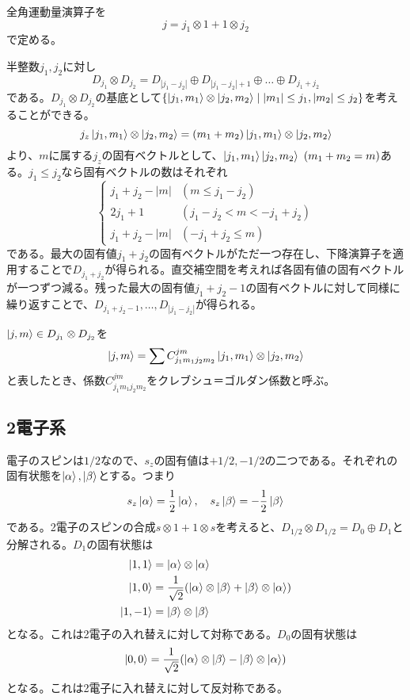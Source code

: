     全角運動量演算子を
        \[j = j_1 \otimes 1 + 1 \otimes j_2\]
    で定める。
    
    半整数$j_1, j_2$に対し
        \[D_{j_1} \otimes D_{j_2} = D_{|j_1-j_2|} \oplus D_{|j_1-j_2|+1} \oplus \dots \oplus D_{j_1+j_2}\]
    である。$D_{j_1} \otimes D_{j_2}$の基底として$\{\ket{j_1, m_1} \otimes \ket{j_2, m_2} \mid |m_1| \leq j_1, |m_2| \leq j_2\}$を考えることができる。
        \[j_z\ket{j_1, m_1} \otimes \ket{j_2, m_2} = (m_1 + m_2)\ket{j_1, m_1} \otimes \ket{j_2, m_2}\]
    より、$m$に属する$j_z$の固有ベクトルとして、$\ket{j_1, m_1}\ket{j_2, m_2}\ (m_1 + m_2 = m)$ある。$j_1 \leq j_2$なら固有ベクトルの数はそれぞれ
    \[
        \begin{cases}
            j_1 + j_2 - |m| & (m \leq j_1 - j_2)\\
            2j_1 + 1 & (j_1 - j_2 < m < -j_1 + j_2)\\
            j_1 + j_2 - |m| & (-j_1 + j_2 \leq m)
        \end{cases}
    \]
    である。最大の固有値$j_1 + j_2$の固有ベクトルがただ一つ存在し、下降演算子を適用することで$D_{j_1+j_2}$が得られる。直交補空間を考えれば各固有値の固有ベクトルが一つずつ減る。残った最大の固有値$j_1 + j_2 - 1$の固有ベクトルに対して同様に繰り返すことで、$D_{j_1+j_2-1}, \dots, D_{|j_1-j_2|}$が得られる。

    $\ket{j, m} \in D_{j_1} \otimes D_{j_2}$を
        \[\ket{j, m} = \sum C^{jm}_{j_1m_1j_2m_2} \ket{j_1, m_1} \otimes \ket{j_2, m_2}\]
    と表したとき、係数$C^{jm}_{j_1m_1j_2m_2}$をクレブシュ＝ゴルダン係数と呼ぶ。

\subsection{2電子系}
    電子のスピンは$1/2$なので、$s_z$の固有値は$+1/2, -1/2$の二つである。それぞれの固有状態を$\ket{\alpha}, \ket{\beta}$とする。つまり
        \[s_z\ket{\alpha} = \frac{1}{2}\ket{\alpha}, \quad s_z\ket{\beta} = -\frac{1}{2}\ket{\beta}\]
    である。2電子のスピンの合成$s \otimes 1 + 1 \otimes s$を考えると、$D_{1/2} \otimes D_{1/2} = D_0 \oplus D_1$と分解される。$D_1$の固有状態は
    \begin{align*}
        \ket{1, 1} &= \ket{\alpha} \otimes \ket{\alpha}\\
        \ket{1, 0} &= \frac{1}{\sqrt{2}}(\ket{\alpha} \otimes \ket{\beta} + \ket{\beta} \otimes \ket{\alpha})\\
        \ket{1, -1} &= \ket{\beta} \otimes \ket{\beta}
    \end{align*}
    となる。これは2電子の入れ替えに対して対称である。$D_0$の固有状態は
        \[\ket{0, 0} = \frac{1}{\sqrt{2}}(\ket{\alpha} \otimes \ket{\beta} - \ket{\beta} \otimes \ket{\alpha})\]
    となる。これは2電子に入れ替えに対して反対称である。

